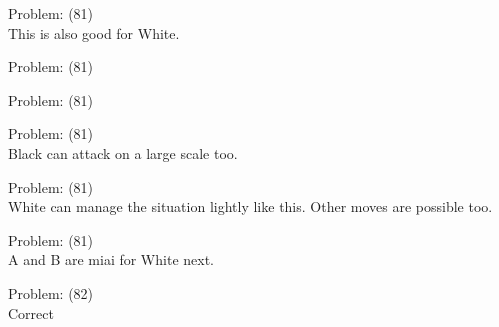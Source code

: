 \documentclass[11pt]{article}
\begin{document}
\begin{minipage}[t]{0.5\textwidth}
  {\centering
  
Problem: (81)\\
This is also good for White.\\
  }
\end{minipage}
\begin{minipage}[t]{0.5\textwidth}
  {\centering
  
Problem: (81)\\
  }
\end{minipage}
\begin{minipage}[t]{0.5\textwidth}
  {\centering
  
Problem: (81)\\
  }
\end{minipage}
\begin{minipage}[t]{0.5\textwidth}
  {\centering
  
Problem: (81)\\
Black can attack on a large scale too.\\
  }
\end{minipage}
\begin{minipage}[t]{0.5\textwidth}
  {\centering
  
Problem: (81)\\
White can manage the situation lightly like this. Other moves are possible too.\\
  }
\end{minipage}
\begin{minipage}[t]{0.5\textwidth}
  {\centering
  
Problem: (81)\\
A and B are miai for White next.\\
  }
\end{minipage}
\begin{minipage}[t]{0.5\textwidth}
  {\centering
  
Problem: (82)\\
Correct\\
  }
\end{minipage}
\end{document}

